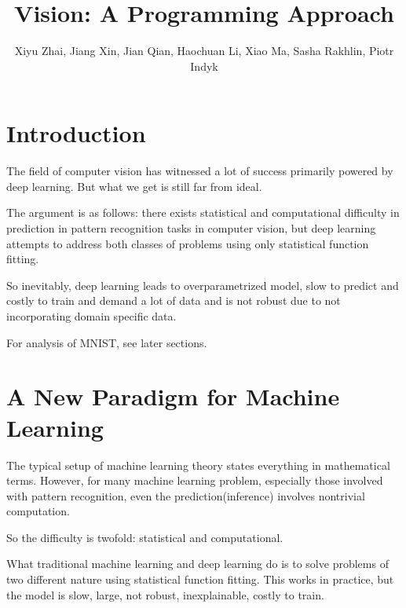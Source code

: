 \documentclass[11pt, oneside]{article}   	%
\title{Vision: A Programming Approach}
\author{Xiyu Zhai, Jiang Xin, Jian Qian, Haochuan Li, Xiao Ma, Sasha Rakhlin, Piotr Indyk}
\date{}							%
\theoremstyle{definition}
\begin{document}
\maketitle
\tableofcontents
{}

\section{Introduction}

The field of computer vision has witnessed a lot of success primarily powered by deep learning. But what we get is still far from ideal.

The argument is as follows: there exists statistical and computational difficulty in prediction in pattern recognition tasks in computer vision, but deep learning attempts to address both classes of problems using only statistical function fitting.


So inevitably, deep learning leads to overparametrized model, slow to predict and costly to train and demand a lot of data and is not robust due to not incorporating domain specific data.

For analysis of MNIST, see later sections.



\section{A New Paradigm for Machine Learning}

The typical setup of machine learning theory states everything in mathematical terms.
However, for many machine learning problem, especially those involved with pattern recognition, even the prediction(inference) involves nontrivial computation.

So the difficulty is twofold: statistical and computational.

What traditional machine learning and deep learning do is to solve problems of two different nature using statistical function fitting.
This works in practice, but the model is slow, large, not robust, inexplainable, costly to train.
\end{document}
